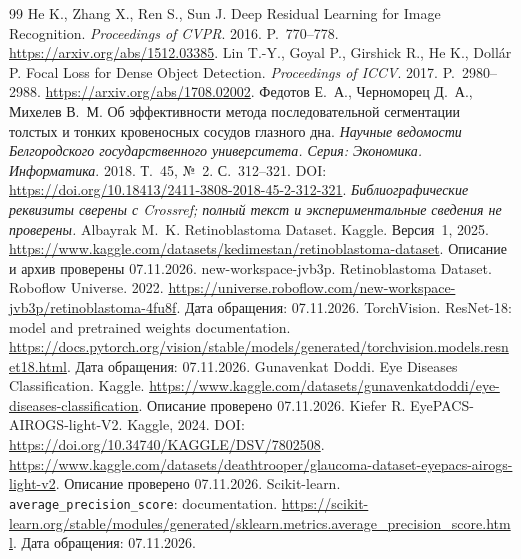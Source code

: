\documentclass{misisarticle}
\begin{document}
\begin{thebibliography}{99}
 He K., Zhang X., Ren S., Sun J. Deep Residual Learning for Image Recognition. \textit{Proceedings of CVPR}. 2016. P.~770--778. \url{https://arxiv.org/abs/1512.03385}.
 Lin T.-Y., Goyal P., Girshick R., He K., Doll\'{a}r P. Focal Loss for Dense Object Detection. \textit{Proceedings of ICCV}. 2017. P.~2980--2988. \url{https://arxiv.org/abs/1708.02002}.
 Федотов Е.~А., Черноморец Д.~А., Михелев В.~М. Об эффективности метода последовательной сегментации толстых и тонких кровеносных сосудов глазного дна. \textit{Научные ведомости Белгородского государственного университета. Серия: Экономика. Информатика}. 2018. Т.~45, №~2. С.~312--321. DOI: \url{https://doi.org/10.18413/2411-3808-2018-45-2-312-321}. \textit{Библиографические реквизиты сверены с Crossref; полный текст и экспериментальные сведения не проверены.}
 Albayrak M.~K. Retinoblastoma Dataset. Kaggle. Версия~1, 2025. \url{https://www.kaggle.com/datasets/kedimestan/retinoblastoma-dataset}. Описание и архив проверены 07.11.2026.
 new-workspace-jvb3p. Retinoblastoma Dataset. Roboflow Universe. 2022. \url{https://universe.roboflow.com/new-workspace-jvb3p/retinoblastoma-4fu8f}. Дата обращения: 07.11.2026.
 TorchVision. ResNet-18: model and pretrained weights documentation. \url{https://docs.pytorch.org/vision/stable/models/generated/torchvision.models.resnet18.html}. Дата обращения: 07.11.2026.
 Gunavenkat Doddi. Eye Diseases Classification. Kaggle. \url{https://www.kaggle.com/datasets/gunavenkatdoddi/eye-diseases-classification}. Описание проверено 07.11.2026.
 Kiefer R. EyePACS-AIROGS-light-V2. Kaggle, 2024. DOI: \url{https://doi.org/10.34740/KAGGLE/DSV/7802508}. \url{https://www.kaggle.com/datasets/deathtrooper/glaucoma-dataset-eyepacs-airogs-light-v2}. Описание проверено 07.11.2026.
 Scikit-learn. \texttt{average\_precision\_score}: documentation. \url{https://scikit-learn.org/stable/modules/generated/sklearn.metrics.average_precision_score.html}. Дата обращения: 07.11.2026.
\end{thebibliography}
\end{document}
